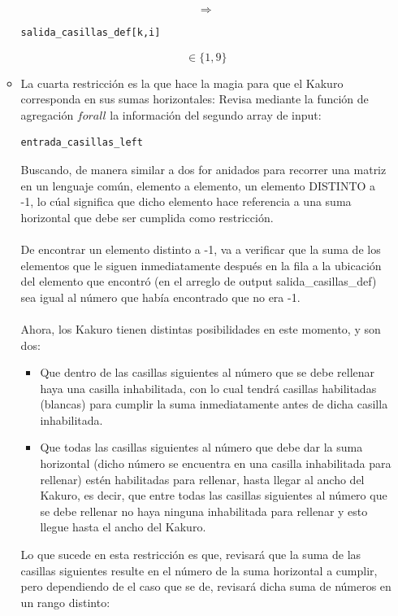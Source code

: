 \documentclass[12pt]{article}
\begin{document}
\begin{itemize}
\begin{itemize}
\begin{equation*}
\Rightarrow
\end{equation*}
\begin{verbatim}
salida_casillas_def[k,i] 
\end{verbatim}
\begin{equation*}
\in \{1,9\}
\end{equation*}
\item La cuarta restricción es la que hace la magia para que el Kakuro corresponda en sus sumas horizontales: Revisa mediante la función de agregación $forall$ la información del segundo array de input: 
\begin{verbatim}
entrada_casillas_left 
\end{verbatim}
Buscando, de manera similar a dos for anidados para recorrer una matriz en un lenguaje común, elemento a elemento, un elemento DISTINTO a -1, lo cúal significa que dicho elemento hace referencia a una suma horizontal que debe ser cumplida como restricción. \\ \\ 
De encontrar un elemento distinto a -1, va a verificar que la suma de los elementos que le siguen inmediatamente después en la fila a la ubicación del elemento que encontró (en el arreglo de output salida\_casillas\_def) sea igual al número que había encontrado que no era -1. 
\\ \\ 
Ahora, los Kakuro tienen distintas posibilidades en este momento, y son dos:
\begin{itemize}
\item Que dentro de las casillas siguientes al número que se debe rellenar haya una casilla inhabilitada, con lo cual tendrá casillas habilitadas (blancas) para cumplir la suma inmediatamente antes de dicha casilla inhabilitada. 
\item Que todas las casillas siguientes al número que debe dar la suma horizontal (dicho número se encuentra en una casilla inhabilitada para rellenar) estén habilitadas para rellenar, hasta llegar al ancho del Kakuro, es decir, que entre todas las casillas siguientes al número que se debe rellenar no haya ninguna inhabilitada para rellenar y esto llegue hasta el ancho del Kakuro.
\end{itemize}
\newpage
Lo que sucede en esta restricción es que, revisará que la suma de las casillas siguientes resulte en el número de la suma horizontal a cumplir, pero dependiendo de el caso que se de, revisará dicha suma de números en un rango distinto:
\begin{itemize}

\end{itemize}
\end{itemize}
\end{itemize}
\end{document}
